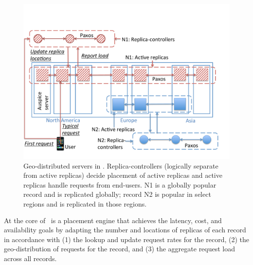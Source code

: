 \begin{figure}[t]
\centering
\vspace{-0.3in}
\includegraphics[scale=0.33]{gns-dns/gnrs.pdf}
\vspace{-0.35in}
\caption{Geo-distributed servers in \auspice.  Replica-controllers  (logically separate from active replicas) decide placement of active replicas and active replicas handle requests from end-users. N1 is a globally popular record and is replicated globally; record N2 is  popular in select regions and is replicated in those regions.}
\vspace{-0.2in}
\label{fig:auspice}
\end{figure}


At the core of \auspice\ is a placement engine that achieves the latency, cost, and availability goals by adapting the number and locations of replicas of each record in accordance with (1) the lookup and update request rates for the record, (2) the geo-distribution of requests for the record, and (3) the aggregate request load across all records. 




